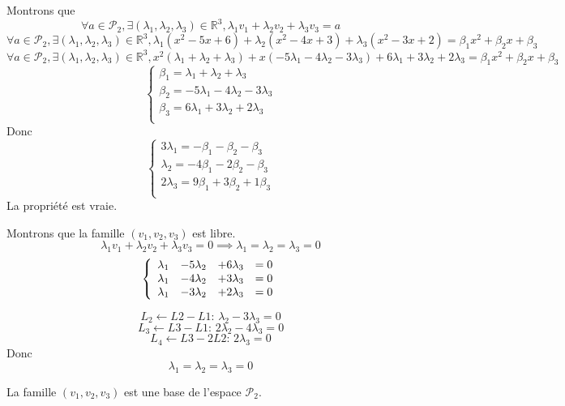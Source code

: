 \documentclass[]{book}
\theoremstyle{definition}
\newcommand{\bb}[1]{\mathbb{#1}}
\newcommand{\R}{\bb{R}}
\begin{document}
Montrons que
$$ \forall a \in \mathcal{P}_2, \exists (\lambda_1,\lambda_2,\lambda_3) \in \R^3,
\lambda_1 v_1 + \lambda_2 v_2 + \lambda_3 v_3 = a
$$
$$ \forall a \in \mathcal{P}_2, \exists (\lambda_1,\lambda_2,\lambda_3) \in \R^3,
\lambda_1 (x^2 -5x + 6) + \lambda_2 (x^2 -4x + 3) + \lambda_3 (x^2 -3x + 2) = \beta_1 x^2 + \beta_2 x + \beta_3
$$
$$ \forall a \in \mathcal{P}_2, \exists (\lambda_1,\lambda_2,\lambda_3) \in \R^3,
x^2 (\lambda_1 + \lambda_2 + \lambda_3) + x (-5\lambda_1 -4\lambda_2-3\lambda_3) + 6\lambda_1 + 3\lambda_2 + 2\lambda_3 = \beta_1 x^2 + \beta_2 x + \beta_3
$$
$$
\left\{ 
\begin{array}{l}
\beta_1 = \lambda_1 + \lambda_2 + \lambda_3 \\
\beta_2 = -5\lambda_1 -4\lambda_2-3\lambda_3 \\ 
\beta_3 = 6\lambda_1 + 3\lambda_2 + 2\lambda_3 \\
\end{array}
\right. 
$$
Donc
$$
\left\{ 
\begin{array}{l}
3\lambda_1 = -\beta_1 - \beta_2 - \beta_3 \\
\lambda_2 = -4\beta_1 - 2\beta_2 - \beta_3 \\
2\lambda_3 = 9\beta_1 + 3\beta_2 + 1\beta_3 \\
\end{array}
\right. 
$$
La propri\'et\'e est vraie.


Montrons que la famille $(v_1,v_2,v_3)$ est libre.
$$
\lambda_1 v_{1} +\lambda_2 v_{2} +\lambda_3 v_{3} = 0
\implies
\lambda_1=\lambda_2=\lambda_3=0
$$
$$
\left\{ 
\begin{array}{l l l l}
\lambda_1 & -5\lambda_2 & +6\lambda_3 & = 0 \\
\lambda_1 & -4\lambda_2 & +3\lambda_3 & = 0 \\
\lambda_1 & -3\lambda_2 & +2\lambda_3 & = 0 \\
\end{array}
\right. 
$$

$$L_2 \leftarrow L2-L1:\, \lambda_2 -3\lambda_3 = 0$$
$$L_3 \leftarrow L3-L1:\, 2\lambda_2 -4\lambda_3 = 0$$
$$L_4 \leftarrow L3-2L2:\, 2\lambda_3 = 0$$
Donc
$$
\lambda_1=\lambda_2=\lambda_3=0
$$

La famille $(v_1,v_2,v_3)$ est une base de l'espace $\mathcal{P}_2$.
\end{document}

